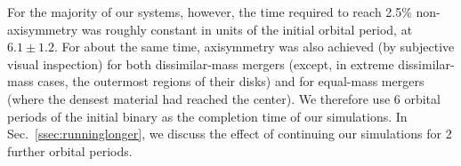 For the majority of our systems, however, the time required to reach 2.5\% non-axisymmetry was roughly constant in units of the initial orbital period, at $6.1\pm1.2$.  For about the same time, axisymmetry was also achieved (by subjective visual inspection) for both dissimilar-mass mergers (except, in extreme dissimilar-mass cases, the outermost regions of their disks) and for equal-mass mergers (where the densest material had reached the center).  We therefore use 6 orbital periods of the initial binary as the completion time of our simulations.  In Sec.~\ref{ssec:runninglonger}, we discuss the effect of continuing our simulations for 2 further orbital periods.
